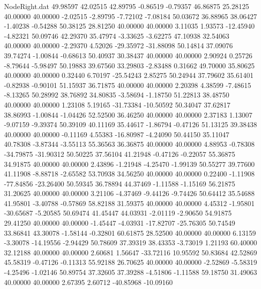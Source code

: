 \begin{filecontents}{NodeRight.dat}
  49.98597   42.02515   42.89795    -0.86519   -0.79357   46.86875   25.28125   40.00000   40.00000   -2.02515   -2.89795   -7.72102   -7.08184
  50.03672   36.88965   38.06427    -1.40238   -0.54288   50.38125   28.81250   40.00000   40.00000    3.11035    1.93573  -12.45940   -4.82321
  50.09746   42.29370   35.47974    -3.33625   -3.62275   47.10938   32.54063   40.00000   40.00000   -2.29370    4.52026  -29.35972  -31.88098
  50.14814   37.09076   39.74274    -1.00844   -0.68613   50.40937   30.38437   40.00000   40.00000    2.90924    0.25726   -8.79644   -5.98497
  50.19883   39.67560   33.29803    -2.83488    0.31662   49.70000   35.80625   40.00000   40.00000    0.32440    6.70197  -25.54243    2.85275
  50.24944   37.79602   35.61401    -0.82938   -0.90101   51.15937   36.71875   40.00000   40.00000    2.20398    4.38599   -7.48615   -8.13265
  50.28992   38.76892   34.80835    -3.58694   -1.18750   51.22813   38.48750   40.00000   40.00000    1.23108    5.19165  -31.73384  -10.50592
  50.34047   37.62817   38.86993    -1.00844   -1.04426   52.52500   36.46250   40.00000   40.00000    2.37183    1.13007   -9.07159   -9.39374
  50.39109   40.11169   35.44617    -1.86794   -0.47126   51.13125   39.38438   40.00000   40.00000   -0.11169    4.55383  -16.80987   -4.24090
  50.44150   35.11047   40.78308    -3.87344   -3.55113   55.36563   36.36875   40.00000   40.00000    4.88953   -0.78308  -34.79875  -31.90312
  50.50225   37.56104   41.21948    -0.47126   -0.22057   55.36875   34.91875   40.00000   40.00000    2.43896   -1.21948   -4.25470   -1.99139
  50.55277   39.77600   41.11908    -8.88718   -2.65582   53.70938   34.56250   40.00000   40.00000    0.22400   -1.11908  -77.84856  -23.26400
  50.59345   36.78894   44.37469    -1.11588   -1.15169   56.21875   31.20625   40.00000   40.00000    3.21106   -4.37469   -9.44126   -9.74426
  50.64412   35.54688   41.95801    -3.40788   -0.57869   58.82188   31.59375   40.00000   40.00000    4.45312   -1.95801  -30.65687   -5.20585
  50.69474   41.45447   44.03931    -2.01119   -2.90650   54.91875   29.41250   40.00000   40.00000   -1.45447   -4.03931  -17.82707  -25.76305
  50.74549   33.86841   43.30078    -1.58144   -0.32801   60.61875   28.52500   40.00000   40.00000    6.13159   -3.30078  -14.19556   -2.94429
  50.78609   37.39319   38.43353    -3.73019    1.21193   60.40000   32.12188   40.00000   40.00000    2.60681    1.56647  -33.72116   10.95592
  50.83684   42.52869   45.58319    -0.47126   -0.11313   55.92188   26.70625   40.00000   40.00000   -2.52869   -5.58319   -4.25496   -1.02146
  50.89754   37.32605   37.39288    -4.51806   -1.11588   59.18750   31.49063   40.00000   40.00000    2.67395    2.60712  -40.85968  -10.09160

\end{filecontents}
